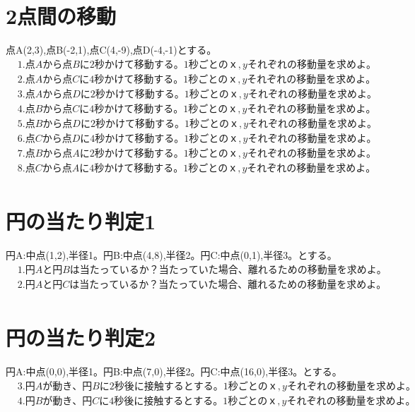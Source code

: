 \documentclass[paper=b4j,landscape,twocolumn,fleqn]{jlreq}
\begin{document}
\section{2点間の移動}
点A(2,3),点B(-2,1),点C(4,-9),点D(-4,-1)とする。
\begin{align*}
　&1.　点Aから点Bに2秒かけて移動する。1秒ごとのｘ,yそれぞれの移動量を求めよ。\\[1em]
　&2.　点Aから点Cに4秒かけて移動する。1秒ごとのｘ,yそれぞれの移動量を求めよ。\\[1em]
　&3.　点Aから点Dに2秒かけて移動する。1秒ごとのｘ,yそれぞれの移動量を求めよ。\\[1em]
　&4.　点Bから点Cに4秒かけて移動する。1秒ごとのｘ,yそれぞれの移動量を求めよ。\\[1em]
　&5.　点Bから点Dに2秒かけて移動する。1秒ごとのｘ,yそれぞれの移動量を求めよ。\\[1em]
　&6.　点Cから点Dに4秒かけて移動する。1秒ごとのｘ,yそれぞれの移動量を求めよ。\\[1em]
　&7.　点Bから点Aに2秒かけて移動する。1秒ごとのｘ,yそれぞれの移動量を求めよ。\\[1em]
　&8.　点Cから点Aに4秒かけて移動する。1秒ごとのｘ,yそれぞれの移動量を求めよ。\\[1em]
\end{align*}
\section{円の当たり判定1}
円A:中点(1,2),半径1。円B:中点(4,8),半径2。円C:中点(0,1),半径3。とする。
\begin{align*}
　&1.　円Aと円Bは当たっているか？　当たっていた場合、離れるための移動量を求めよ。\\[1em]
　&2.　円Aと円Cは当たっているか？　当たっていた場合、離れるための移動量を求めよ。\\[1em]
\end{align*}
\section{円の当たり判定2}
円A:中点(0,0),半径1。円B:中点(7,0),半径2。円C:中点(16,0),半径3。とする。
\begin{align*}
　&3.　円Aが動き、円Bに2秒後に接触するとする。1秒ごとのｘ,yそれぞれの移動量を求めよ。\\[1em]
　&4.　円Bが動き、円Cに4秒後に接触するとする。1秒ごとのｘ,yそれぞれの移動量を求めよ。\\[1em]
\end{align*}
\end{document}
